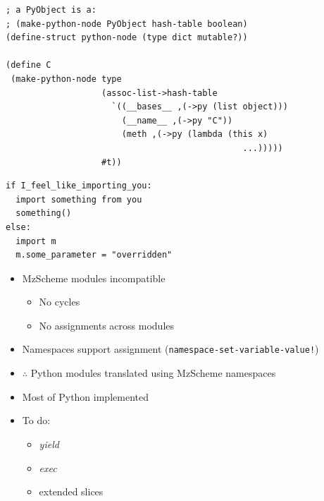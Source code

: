 \documentclass[landscape,20pt,dvips]{foils}
\newlength\oldfoilheadskip
\newcommand{\jhead}[1]{\foilhead{\flushleft \textcolor{vinho}{\large   #1}
\vspace{-0.84cm} \\ {\color{black} --------------------------------------------------------------- }}}
\begin{document}
\begin{lstlisting}
; a PyObject is a:
; (make-python-node PyObject hash-table boolean)
(define-struct python-node (type dict mutable?))

(define C
 (make-python-node type
                   (assoc-list->hash-table
                     `((__bases__ ,(->py (list object)))
                       (__name__ ,(->py "C"))
                       (meth ,(->py (lambda (this x)
                                               ...)))))
                   #t))
\end{lstlisting}
\jhead{Translations: Modules}
\lstset{language=Python}
\begin{lstlisting}
if I_feel_like_importing_you:
  import something from you
  something()
else:
  import m
  m.some_parameter = "overridden"
\end{lstlisting}
  \begin{itemize}
    \item MzScheme modules incompatible
      \begin{itemize}
        \item No cycles
        \item No assignments across modules
      \end{itemize}
    \item Namespaces support assignment (\verb|namespace-set-variable-value!|)
    \item $\therefore{}$ Python modules translated using MzScheme namespaces
  \end{itemize}
\jhead{Status: Language}
  \begin{itemize}
    \item Most of Python implemented
    \item To do:
    \begin{itemize}
      \item \emph{yield}
      \item \emph{exec}
      \item extended slices
    \end{itemize}
  \end{itemize}
\setlength\foilheadskip{-1cm}
\jhead{Status: Language Example: Classes}
\setlength\foilheadskip{\oldfoilheadskip}
\end{document}
